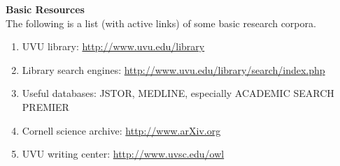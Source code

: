 \documentclass [11pt]{article}
\begin{document}
  
  {\bf Basic Resources}\\
  The following is a list (with active links) of some basic research corpora.
  \begin{enumerate}
\item UVU library: \href{http://www.uvu.edu/library}{http://www.uvu.edu/library}
\item Library search engines: \href{http://www.uvu.edu/library/search/index.php}{http://www.uvu.edu/library/search/index.php}
\item Useful databases: JSTOR, MEDLINE, especially ACADEMIC SEARCH PREMIER
\item Cornell science archive: \href{http://www.arXiv.org}{http://www.arXiv.org}
\item UVU writing center: \href{http://www.uvsc.edu/owl}{http://www.uvsc.edu/owl}
\end{enumerate}
\ \\
\end{document}
